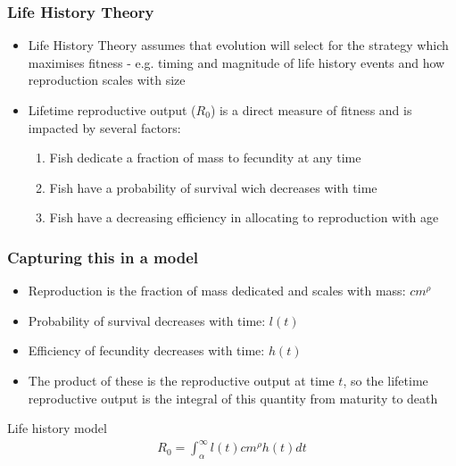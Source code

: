 \documentclass[handout]{beamer}
\begin{document}
\begin{frame}
	\frametitle{Life History Theory}
	\begin{itemize}
		\item Life History Theory assumes that evolution will select for the strategy which maximises fitness - e.g. timing and magnitude of life history events and how reproduction scales with size
		\item Lifetime reproductive output ($R_0$) is a direct measure of fitness and is impacted by several factors:
		\begin{enumerate}
			\item Fish dedicate a fraction of mass to fecundity at any time 
			\item Fish have a probability of survival wich decreases with time
			\item Fish have a decreasing efficiency in allocating to reproduction with age
		\end{enumerate}
	\end{itemize}
\end{frame}

\begin{frame}
	\frametitle{Capturing this in a model}
	\begin{itemize}
		\item Reproduction is the fraction of mass dedicated and scales with mass: $cm^{\rho}$
		\item Probability of survival decreases with time: $l(t)$
		\item Efficiency of fecundity decreases with time: $h(t)$
		\item The product of these is the reproductive output at time $t$, so the lifetime reproductive output is the integral of this quantity from maturity to death
	\end{itemize}
	\begin{block}{Life history model}
		\begin{align*}
			R_0 = \int_{\alpha}^{\infty}l(t)cm^{\rho}h(t) dt
		\end{align*}
	\end{block}
\end{frame}
\end{document}
